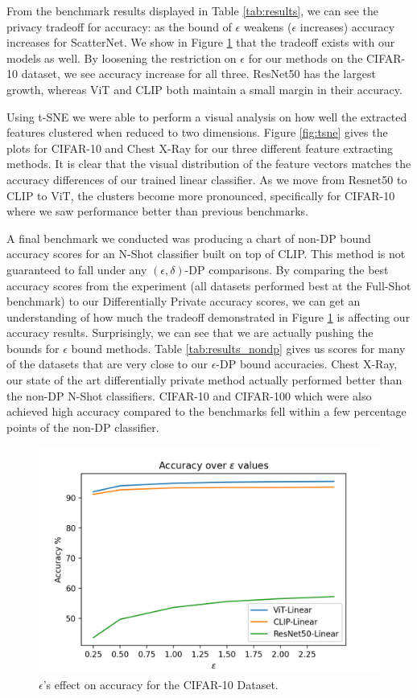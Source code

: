 \documentclass{article}
\theoremstyle{definition}
\begin{document}
From the benchmark results displayed in Table \ref{tab:results}, we can see the privacy tradeoff for accuracy: as the bound of $\epsilon$ weakens ($\epsilon$ increases) accuracy increases for ScatterNet. We show in Figure \ref{fig:acc_epsilon} that the tradeoff exists with our models as well. By loosening the restriction on $\epsilon$ for our methods on the CIFAR-10 dataset, we see accuracy increase for all three. ResNet50 has the largest growth, whereas ViT and CLIP both maintain a small margin in their accuracy.

Using t-SNE we were able to perform a visual analysis on how well the extracted features clustered when reduced to two dimensions. Figure \ref{fig:tsne} gives the plots for CIFAR-10 and Chest X-Ray for our three different feature extracting methods. It is clear that the visual distribution of the feature vectors matches the accuracy differences of our trained linear classifier. As we move from Resnet50 to CLIP to ViT, the clusters become more pronounced, specifically for CIFAR-10 where we saw performance better than previous benchmarks.

A final benchmark we conducted was producing a chart of non-DP bound accuracy scores for an N-Shot classifier built on top of CLIP. This method is not guaranteed to fall under any $(\epsilon,\delta)$-DP comparisons. By comparing the best accuracy scores from the experiment (all datasets performed best at the Full-Shot benchmark) to our Differentially Private accuracy scores, we can get an understanding of how much the tradeoff demonstrated in Figure \ref{fig:acc_epsilon} is affecting our accuracy results. Surprisingly, we can see that we are actually pushing the bounds for $\epsilon$ bound methods. Table \ref{tab:results_nondp} gives us scores for many of the datasets that are very close to our $\epsilon$-DP bound accuracies. Chest X-Ray, our state of the art differentially private method actually performed better than the non-DP N-Shot classifiers. CIFAR-10 and CIFAR-100 which were also achieved  high accuracy compared to the benchmarks fell within a few percentage points of the non-DP classifier.

\begin{figure}[h]
    \centering
    \includegraphics[width=.4\textwidth]{Final project/img/acc_epsilon.png}
    \caption{$\epsilon$'s effect on accuracy for the CIFAR-10 Dataset.}
    \label{fig:acc_epsilon}
\end{figure}
\end{document}
